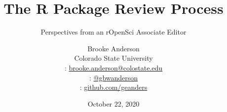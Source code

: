 \usepackage{booktabs}
\usepackage{array}
\usepackage{colortbl}
\usepackage[british]{babel}
\usepackage{graphicx,hyperref,url}
\usepackage{fontawesome}
\usepackage{hyperref}
\usepackage{adjustbox}
\usepackage{appendixnumberbeamer}
\hypersetup{colorlinks=true,allcolors=blue}

\title{The R Package Review Process}
\subtitle{Perspectives from an rOpenSci Associate Editor}
\date{October 22, 2020}

\author[Anderson]{
  Brooke Anderson \\ 
  Colorado State University \medskip \\ 
  {\small \faEnvelope: \url{brooke.anderson@colostate.edu}} \\
  {\small \faTwitter: \href{www.twitter.com/gbwanderson}{@gbwanderson}} \\
  {\small \faGithub:  \url{github.com/geanders}}
  }


